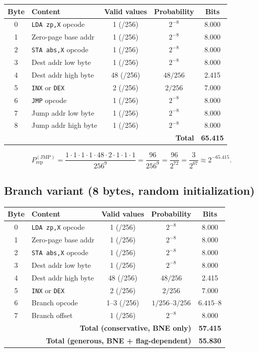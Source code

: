 \documentclass{article}
\newcommand{\opcode}[1]{\texttt{#1}}
\newcommand{\Prep}{P_{\mathrm{rep}}}
\begin{document}
\begin{center}
\begin{tabular}{clccc}
\toprule
Byte & Content & Valid values & Probability & Bits \\
\midrule
0 & \opcode{LDA zp,X} opcode & 1 (/256) & $2^{-8}$ & 8.000 \\
1 & Zero-page base addr & 1 (/256) & $2^{-8}$ & 8.000 \\
2 & \opcode{STA abs,X} opcode & 1 (/256) & $2^{-8}$ & 8.000 \\
3 & Dest addr low byte & 1 (/256) & $2^{-8}$ & 8.000 \\
4 & Dest addr high byte & 48 (/256) & $48/256$ & 2.415 \\
5 & \opcode{INX} or \opcode{DEX} & 2 (/256) & $2/256$ & 7.000 \\
6 & \opcode{JMP} opcode & 1 (/256) & $2^{-8}$ & 8.000 \\
7 & Jump addr low byte & 1 (/256) & $2^{-8}$ & 8.000 \\
8 & Jump addr high byte & 1 (/256) & $2^{-8}$ & 8.000 \\
\midrule
\multicolumn{4}{r}{\textbf{Total}} & \textbf{65.415} \\
\bottomrule
\end{tabular}
\end{center}

\[
  \Prep^{(\mathrm{JMP})} = \frac{1 \cdot 1 \cdot 1 \cdot 1 \cdot 48 \cdot 2 \cdot 1 \cdot 1 \cdot 1}{256^9} = \frac{96}{256^9} = \frac{96}{2^{72}} = \frac{3}{2^{67}} \approx 2^{-65.415}.
\]

\subsection{Branch variant (8 bytes, random initialization)}

\begin{center}
\begin{tabular}{clccc}
\toprule
Byte & Content & Valid values & Probability & Bits \\
\midrule
0 & \opcode{LDA zp,X} opcode & 1 (/256) & $2^{-8}$ & 8.000 \\
1 & Zero-page base addr & 1 (/256) & $2^{-8}$ & 8.000 \\
2 & \opcode{STA abs,X} opcode & 1 (/256) & $2^{-8}$ & 8.000 \\
3 & Dest addr low byte & 1 (/256) & $2^{-8}$ & 8.000 \\
4 & Dest addr high byte & 48 (/256) & $48/256$ & 2.415 \\
5 & \opcode{INX} or \opcode{DEX} & 2 (/256) & $2/256$ & 7.000 \\
6 & Branch opcode & 1--3 (/256) & $1/256$--$3/256$ & $6.415$--$8$ \\
7 & Branch offset & 1 (/256) & $2^{-8}$ & 8.000 \\
\midrule
\multicolumn{4}{r}{\textbf{Total (conservative, BNE only)}} & \textbf{57.415} \\
\multicolumn{4}{r}{\textbf{Total (generous, BNE + flag-dependent)}} & \textbf{55.830} \\
\bottomrule
\end{tabular}
\end{center}
\end{document}
